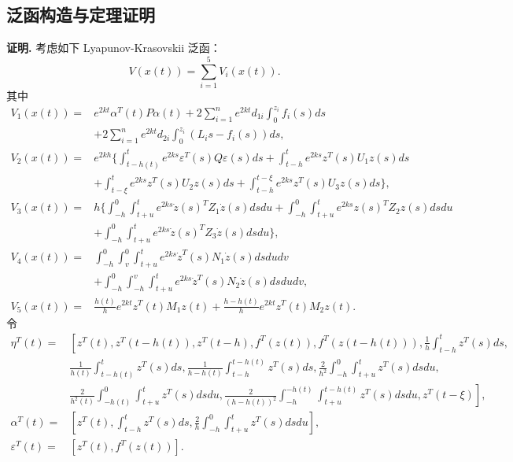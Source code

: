 \documentclass[a4paper, 12pt, oneside]{article}
\theoremstyle{cn_theorem}
\begin{document}
\subsection{泛函构造与定理证明}
\textbf{\heiti 证明.} 考虑如下 Lyapunov-Krasovskii 泛函：
\begin{equation*}
    V(x(t)) = \sum_{i=1}^{5} V_i(x(t)).
\end{equation*}
其中
\begin{align*}
    V_1(x(t)) =& e^{2kt} \alpha^T(t) P \alpha(t) + 2 \sum_{i=1}^n e^{2kt} d_{1i} \int_0^{z_i} f_i(s) ds \nonumber \\
               & + 2 \sum_{i=1}^n e^{2kt} d_{2i} \int_0^{z_i} (L_i s - f_i(s)) ds, \\
    V_2(x(t)) =& e^{2kh} \Bigg\{ \int_{t-h(t)}^t e^{2ks} \varepsilon^T(s) Q \varepsilon(s) ds + \int_{t-h}^t e^{2ks} z^T(s) U_1 z(s) ds \nonumber \\
               & + \int_{t-\xi}^t e^{2ks} z^T(s) U_2 z(s) ds + \int_{t-h}^{t-\xi} e^{2ks} z^T(s) U_3 z(s) ds \Bigg\}, \\
    V_3(x(t)) =& h \Bigg\{ \int_{-h}^0 \int_{t+u}^t e^{2ks} \dot{z}(s)^T Z_1 \dot{z}(s) ds du + \int_{-h}^0 \int_{t+u}^t e^{2ks} z(s)^T Z_2 z(s) ds du \nonumber \\
               & + \int_{-h}^0 \int_{t+u}^t e^{2ks} \dot{z}(s)^T Z_3 \dot{z}(s) ds du \Bigg\}, \\
    V_4(x(t)) =& \int_{-h}^0 \int_v^0 \int_{t+u}^t e^{2ks} \dot{z}^T(s) N_1 \dot{z}(s) ds du dv \nonumber \\
               & + \int_{-h}^0 \int_{-h}^v \int_{t+u}^t e^{2ks} \dot{z}^T(s) N_2 \dot{z}(s) ds du dv, \\
    V_5(x(t)) =& \frac{h(t)}{h} e^{2kt} z^T(t) M_1 z(t) + \frac{h-h(t)}{h} e^{2kt} z^T(t) M_2 z(t).
\end{align*}
令 
\begin{align*}
    \eta^T(t) = & \left[ z^T(t), z^T(t-h(t)), z^T(t-h), f^T(z(t)), f^T(z(t-h(t))), \frac{1}{h}\int_{t-h}^t z^T(s)ds, \right. \\
                & \frac{1}{h(t)}\int_{t-h(t)}^t z^T(s)ds, \frac{1}{h-h(t)}\int_{t-h}^{t-h(t)} z^T(s)ds, \frac{2}{h^2}\int_{-h}^0 \int_{t+u}^t z^T(s)ds du, \\
                & \left. \frac{2}{h^2(t)}\int_{-h(t)}^0 \int_{t+u}^t z^T(s)ds du, \frac{2}{(h-h(t))^2}\int_{-h}^{-h(t)} \int_{t+u}^{t-h(t)} z^T(s)ds du, z^T(t-\xi) \right], \\
    \alpha^T(t) =& \left[ z^T(t), \int_{t-h}^t z^T(s)ds, \frac{2}{h} \int_{-h}^0 \int_{t+u}^t z^T(s)ds du \right], \\
    \varepsilon^T(t) =& \left[ z^T(t), f^T(z(t)) \right].
\end{align*}
\end{document}
